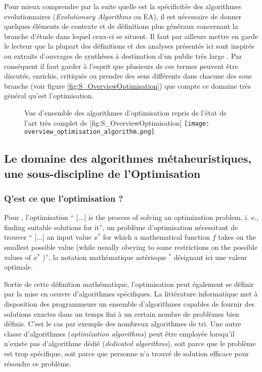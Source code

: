 Pour mieux comprendre par la suite quelle est la spécificitée des algorithmes evolutionnaires (\textit{Evolutionary Algorithms} ou EA), il est nécessaire de donner quelques éléments de contexte et de définitions plus généraux concernant la branche d'étude dans lequel ceux-ci se situent. Il faut par ailleurs mettre en garde le lecteur que la plupart des définitions et des analyses présentés ici sont inspirés ou extraits d'ouvrages de synthèses à destination d'un public très large \autocites{Weise2011, Luke2013, Brownlee2012}. Par conséquent il faut garder à l'esprit que plusieurs de ces termes peuvent être discutés, enrichis, critiqués ou prendre des sens différents dans chacune des sous branche (voir figure \ref{fig:S_OverviewOptimisation}) que compte ce domaine très général qu'est l'optimisation.

\begin{figure}[h]
\begin{sidecaption}[fortoc]{ Vue d'ensemble des algorithmes d'optimisation repris de l'état de l'art très complet de \textcite[32]{Weise2011}}[fig:S_OverviewOptimisation]
  \centering
 \texttt{[image: overview\_optimisation\_algorithm.png]}
  \end{sidecaption}
\end{figure}

\subsection{Le domaine des algorithmes métaheuristiques, une sous-discipline de l'Optimisation}

\subsubsection{Q'est ce que l'optimisation ?}
\label{sssec:Optimisation}

Pour \textcite[22]{Weise2011}, l'optimisation \foreignquote{english}{ [...] is the process of solving an optimization problem, i. e., finding suitable solutions for it}, un problème d'optimisation nécessitant de trouver \foreignquote{english}{ [...] an input value $x^*$ for which a mathematical function $f$ takes on the smallest possible value (while usually obeying to some restrictions on the possible values of $x^*$ )}, la notation mathématique astérisque $^*$ désignant ici une valeur optimale.

Sortie de cette définition mathématique, l'optimisation peut également se définir par la mise en oeuvre d'algorithmes spécifiques. La littérature informatique met à disposition des programmeurs un ensemble d'algorithmes capables de fournir des solutions exactes dans un temps fini à un certain nombre de problèmes bien définis. C'est le cas par exemple des nombreux algorithmes de tri. Une autre classe d'algorithmes (\textit{optimization algorithms}) peut être employée lorsqu'il n'existe pas d'algorithme dédié (\textit{dedicated algorithms}), soit parce que le problème est trop spécifique, soit parce que personne n'a trouvé de solution efficace pour résoudre ce problème. 

